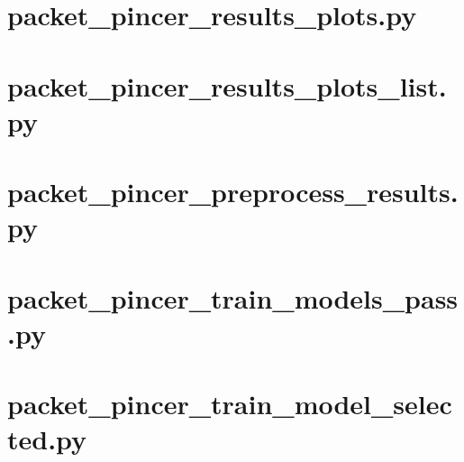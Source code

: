 \documentclass[11pt]{report}
\begin{document}
\section{packet\_pincer\_results\_plots.py}


\section{packet\_pincer\_results\_plots\_list.py}


\section{packet\_pincer\_preprocess\_results.py}


\section{packet\_pincer\_train\_models\_pass.py}


\section{packet\_pincer\_train\_model\_selected.py}

\end{document}
